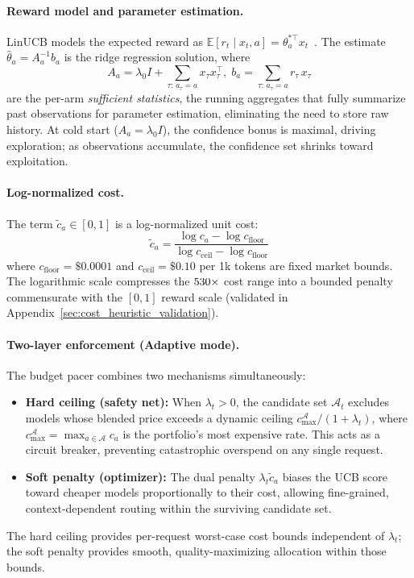 \paragraph{Reward model and parameter estimation.}
LinUCB models the expected reward as $\mathbb{E}[r_t \mid x_t, a] = \theta_a^{*\top} x_t$~\cite{li2010contextual}. The estimate $\hat\theta_a = A_a^{-1} b_a$ is the ridge regression solution, where
\begin{equation}
    A_a = \lambda_0 I + \textstyle\sum_{\tau:\, a_\tau = a} x_\tau x_\tau^\top,\;
    b_a = \textstyle\sum_{\tau:\, a_\tau = a} r_\tau\, x_\tau
    \label{eq:sufficient_stats}
\end{equation}
are the per-arm \emph{sufficient statistics}, the running aggregates that fully summarize past observations for parameter estimation, eliminating the need to store raw history. At cold start ($A_a = \lambda_0 I$), the confidence bonus is maximal, driving exploration; as observations accumulate, the confidence set shrinks toward exploitation.

\paragraph{Log-normalized cost.}
The term $\tilde{c}_a \in [0,1]$ is a log-normalized unit cost:
\begin{equation}
    \tilde{c}_a = \frac{\log c_a - \log c_{\mathrm{floor}}}{\log c_{\mathrm{ceil}} - \log c_{\mathrm{floor}}}
    \label{eq:cost_norm}
\end{equation}
where $c_{\mathrm{floor}}{=}\$0.0001$ and $c_{\mathrm{ceil}}{=}\$0.10$ per 1k tokens are fixed market bounds. The logarithmic scale compresses the $530{\times}$ cost range into a bounded penalty commensurate with the $[0,1]$ reward scale (validated in Appendix~\ref{sec:cost_heuristic_validation}).

\paragraph{Two-layer enforcement (Adaptive mode).}
The budget pacer combines two mechanisms simultaneously:
\begin{itemize}[nosep,leftmargin=*]
  \item \textbf{Hard ceiling (safety net):} When $\lambda_t > 0$, the candidate set $\mathcal{A}_t$ excludes models whose blended price exceeds a dynamic ceiling $c_{\max}^{\mathcal{A}} / (1 + \lambda_t)$, where $c_{\max}^{\mathcal{A}} = \max_{a \in \mathcal{A}} c_a$ is the portfolio's most expensive rate. This acts as a circuit breaker, preventing catastrophic overspend on any single request.
  \item \textbf{Soft penalty (optimizer):} The dual penalty $\lambda_t \tilde{c}_a$ biases the UCB score toward cheaper models proportionally to their cost, allowing fine-grained, context-dependent routing within the surviving candidate set.
\end{itemize}
The hard ceiling provides per-request worst-case cost bounds independent of $\lambda_t$; the soft penalty provides smooth, quality-maximizing allocation within those bounds.

